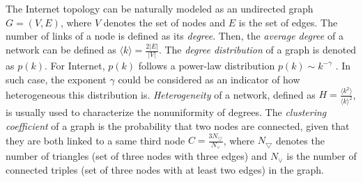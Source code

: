 \documentclass[a4paper]{llncs}
\begin{document}
The Internet topology can be naturally modeled as an undirected graph $G=(V,E)$,
where $V$ denotes the set of nodes and $E$ is the set of edges. The number of links of a node is defined as its {\it degree}. Then, the {\it average degree} of a network can be defined as $\langle k \rangle=\frac{2|E|}{|V|}$.
The {\it degree distribution} of a graph is denoted as $p(k)$. For Internet, $p(k)$ follows a power-law distribution $p(k)\sim
k^{-\gamma}$ \cite{PowerLawRelationship}.
In such case, the exponent $\gamma$ could be considered as
an indicator of how heterogeneous this distribution is.
{\it Heterogeneity} of a
network, defined as $H=\frac{\langle k^2 \rangle}{\langle k \rangle^2}$,
is usually used to characterize the nonuniformity of degrees. The {\it clustering coefficient} of a graph is the probability that two nodes are connected, given that they are both linked to a same third node $C=\frac{3N_\bigtriangledown}{N_\vee}$,
where $N_\bigtriangledown$ denotes the number of triangles (set of three nodes with three edges) and $N_\vee$ is the number of connected triples (set of three nodes with at least two edges) in the graph.
\begin{comment}
\begin{table*}[!t]
\scriptsize
\caption{Network topology properties of the two real datasets: iPlane and skitter.}
\label{Properties of iPlane and skitter}
\vspace{-1.2em}
\centering
\setlength{\tabcolsep}{5pt}
\begin{tabular}{c||c|c|c|c|c|c|c}
\hline \hline
    Dataset & $|V|$ & $|E|$ & $\langle k \rangle$ & $\gamma$ & $\delta$ & $C$ & $H$ \\
\hline
    iPlane & 266,317 & 1,663,170 & 12.49 & 2.799 & 0.000047 & 0.0294 & 8.411 \\
\hline
    skitter & 771,312 & 1,785,922 & 4.63 & 2.39 & 0.000006 & 0.000782  & 130.72 \\
\hline \hline
\end{tabular}
\end{table*}
\end{comment}
\begin{comment}
\begin{figure}[!t]
\centering
\texttt{[image: figure/figure1.eps]}
\vspace{-1.5em}
\caption{$CCDF$ of $G$ of the two real Internet datasets: iPlane and skitter, respectively.}
\label{figure1}
\vspace{-0.5em}
\end{figure}
\end{comment}
\end{document}
